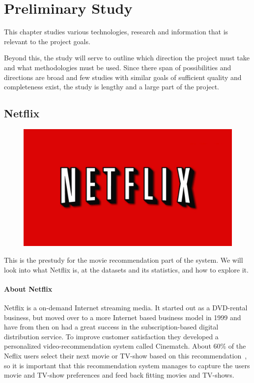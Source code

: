 
\chapter{Preliminary Study}

\minitoc
\noindent
This chapter studies various technologies, research and information that is relevant to the project goals.

Beyond this, the study will serve to outline which direction the project must take and what methodologies must be used. Since there span of possibilities and directions are broad and few studies with similar goals of sufficient quality and completeness exist, the study is lengthy and a large part of the project.

\clearpage



\section{Netflix}

\begin{figure}
\vspace{-30pt}
\centering
\includegraphics[width = .25\textwidth]{image/netflix-logo.png}
\end{figure}
This is the prestudy for the movie recommendation part of the system. We will look into what Netflix is, at the datasets and its statistics, and how to explore it.

\subsubsection{About Netflix}
Netflix is a on-demand Internet streaming media. It started out as a DVD-rental business, but moved over to a more Internet based business model in 1999 and have from then on had a great success in the subscription-based digital distribution service. To improve customer satisfaction they developed a personalized video-recommendation system called Cinematch. About 60\% of the Neflix users select their next movie or TV-show based on this recommendation~\cite{hownetflixworks}, so it is important that this recommendation system manages to capture the users movie and TV-show preferences and feed back fitting movies and TV-shows.

